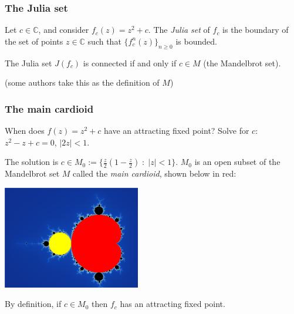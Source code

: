 \documentclass{beamer} %
\theoremstyle{definition} %
\newcommand{\Cplx}{\mathbb{C}}
\begin{document}
\begin{frame}\frametitle{The Julia set}
    Let $c \in \Cplx$, and consider $f_c(z) = z^2+c$. The \emph{Julia set} of $f_c$ is the boundary
    of the set of points $z \in \Cplx$ such that $\{f_c^n(z)\}_{n\geq 0}$ is bounded.
    \begin{theorem}[Mandelbrot]
        The Julia set $J(f_c)$ is connected if and only if $c \in M$ (the Mandelbrot set).
    \end{theorem}
    (some authors take this as the definition of $M$)
\end{frame}
% 
%     
% 
%     
%     
%     
%         
%         

\begin{frame}\frametitle{The main cardioid}
    When does $f(z) = z^2+c$ have an attracting fixed point? Solve for $c$:
    $z^2-z+c = 0$, $|2z| < 1$.
    
    The solution is $c \in M_0 := \{\frac{z}{2}(1-\frac{z}{2})\;:\;|z|<1\}$. $M_0$ is 
    an open subset of the Mandelbrot set $M$ called the \emph{main cardioid}, shown below in red:
    \begin{center}
        \includegraphics[width=60mm]{img/main-cardioid.png}
    \end{center}
    By definition, if $c \in M_0$ then $f_c$ has an attracting fixed point.
\end{frame}
\end{document}
